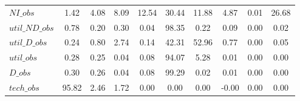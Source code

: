 \begin{center}
\begin{longtable}{lccccccccc}
$NI\_obs        $	 & 	         1.42	 & 	         4.08	 & 	         8.09	 & 	        12.54	 & 	        30.44	 & 	        11.88	 & 	         4.87	 & 	         0.01	 & 	        26.68 \\ 
$util\_ND\_obs  $	 & 	         0.78	 & 	         0.20	 & 	         0.30	 & 	         0.04	 & 	        98.35	 & 	         0.22	 & 	         0.09	 & 	         0.00	 & 	         0.02 \\ 
$util\_D\_obs   $	 & 	         0.24	 & 	         0.80	 & 	         2.74	 & 	         0.14	 & 	        42.31	 & 	        52.96	 & 	         0.77	 & 	         0.00	 & 	         0.05 \\ 
$util\_obs      $	 & 	         0.28	 & 	         0.25	 & 	         0.04	 & 	         0.08	 & 	        94.07	 & 	         5.28	 & 	         0.01	 & 	         0.00	 & 	         0.00 \\ 
$D\_obs         $	 & 	         0.30	 & 	         0.26	 & 	         0.04	 & 	         0.08	 & 	        99.29	 & 	         0.02	 & 	         0.01	 & 	         0.00	 & 	         0.00 \\ 
$tech\_obs      $	 & 	        95.82	 & 	         2.46	 & 	         1.72	 & 	         0.00	 & 	         0.00	 & 	         0.00	 & 	        -0.00	 & 	         0.00	 & 	         0.00 \\ 
\end{longtable}
 \end{center}
